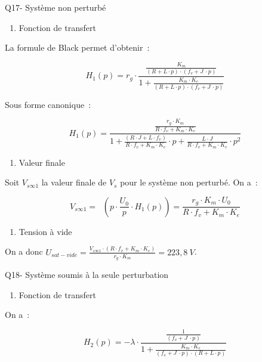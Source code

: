 \documentclass[]{article}
\date{}
\begin{document}
Q17- Système non perturbé

\begin{enumerate}
\def\labelenumi{\alph{enumi}.}
\item
  Fonction de transfert
\end{enumerate}

La formule de Black permet d'obtenir~:

\[H_{1}\left( p \right) = r_{g} \cdot \frac{\frac{K_{m}}{\left( R + L \cdot p \right) \cdot \left( f_{v} + J\  \cdot p \right)}}{1 + \frac{K_{m} \cdot K_{e}}{\left( R + L \cdot p \right) \cdot \left( f_{v} + J\  \cdot p \right)}}\]

Sous forme canonique~:

\[H_{1}\left( p \right) = \frac{\frac{r_{g} \cdot K_{m}}{R \cdot f_{v} + K_{m} \cdot K_{e}}}{1 + \frac{\left( R \cdot J + L \cdot f_{v} \right)}{R \cdot f_{v} + K_{m} \cdot K_{e}} \cdot p + \frac{L \cdot J}{R \cdot f_{v} + K_{m} \cdot K_{e}} \cdot p^{2}}\]

\begin{enumerate}
\def\labelenumi{\alph{enumi}.}
\item
  Valeur finale
\end{enumerate}

Soit \(V_{s\infty 1}\) la valeur finale de \(V_{s}\) pour le système non
perturbé. On a~:

\[V_{s\infty 1} = \operatorname{}{\left( p \cdot \frac{U_{0}}{p} \cdot H_{1}\left( p \right) \right) = \frac{r_{g} \cdot K_{m} \cdot U_{0}}{R \cdot f_{v} + K_{m} \cdot K_{e}}}\]

\begin{enumerate}
\def\labelenumi{\alph{enumi}.}
\item
  Tension à vide
\end{enumerate}

On a donc
\(U_{sat - vide} = \frac{V_{s\infty 1} \cdot \left( R \cdot f_{v} + K_{m} \cdot K_{e} \right)}{r_{g} \cdot K_{m}} = 223,8\ V\).

Q18- Système soumis à la seule perturbation

\begin{enumerate}
\def\labelenumi{\alph{enumi}.}
\item
  Fonction de transfert
\end{enumerate}

On a~:

\[H_{2}\left( p \right) = - \lambda \cdot \frac{\frac{1}{\left( f_{v} + J\  \cdot p \right)}}{1 + \frac{K_{m} \cdot K_{e}}{\left( f_{v} + J\  \cdot p \right) \cdot \left( R + L \cdot p \right)}}\]
\end{document}
